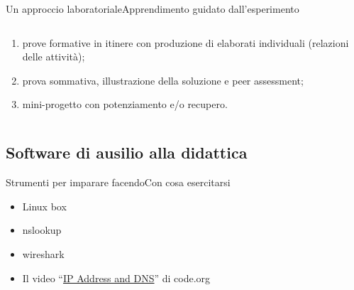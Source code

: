 \documentclass[italian]{beamer}
\begin{document}
\begin{frame}[fragile]{Un approccio laboratoriale}{Apprendimento guidato dall'esperimento}
\begin{columns}
\begin{column}{0.7\textwidth}
\begin{enumerate}
				\item prove formative in itinere con produzione di elaborati individuali (relazioni delle attivit\`a);
				
				\item prova sommativa, illustrazione della soluzione e peer assessment;
				
				\item mini-progetto con potenziamento e/o recupero.
			\end{enumerate}			
			
		\end{column}
	\end{columns}

	\note{%
		
	}%
\end{frame}

\subsection[Strumenti\ldots]{Software di ausilio alla didattica}
\begin{frame}{Strumenti per imparare facendo}{Con cosa esercitarsi}
	\begin{itemize}
		\item Linux box
		
		\item nslookup
		
		\item wireshark
		
		\item Il video ``\hyperlink{https://youtu.be/D-VCk4_GMjQ?list=PLa_solX20V8I8t5sIW7A5Vx3v5YZ-OM3S}{IP Address and DNS}'' di code.org
		
	\end{itemize}
	\note{%
		
	}%
\end{frame}
\end{document}
